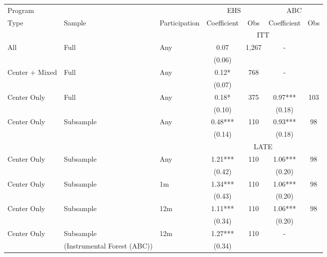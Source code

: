 \begin{tabular}{lllcccc}
\toprule 
\midrule 
\multicolumn{3}{l}{Program} & \multicolumn{2}{c}{EHS} & \multicolumn{2}{c}{ABC} \\
 \cmidrule(lr){1-3} \cmidrule(lr){4-5} \cmidrule(lr){6-7} 
Type & Sample & Participation & Coefficient & Obs & Coefficient & Obs \\
\midrule 
\multicolumn{3}{c}{} & \multicolumn{4}{c}{ITT} \\
 \cmidrule(lr){4-7} 
All & Full & Any & 0.07 & 1,267 & - \\
 &  &  & (0.06) &  \\
Center $+$ Mixed & Full & Any & 0.12* & 768 & - \\
 &  &  & (0.07) &  \\
Center Only & Full & Any & 0.18* & 375 & 0.97*** & 103 \\
 &  &  & (0.10) &  & (0.18) &  \\
Center Only & Subsample & Any & 0.48*** & 110 & 0.93*** & 98 \\
 &  &  & (0.14) &  & (0.18) &  \\
\midrule 
\multicolumn{3}{c}{} & \multicolumn{4}{c}{LATE} \\
 \cmidrule(lr){4-7} 
Center Only & Subsample & Any & 1.21*** & 110 & 1.06*** & 98 \\
 &  &  & (0.42) &  & (0.20) &  \\
Center Only & Subsample & 1m & 1.34*** & 110 & 1.06*** & 98 \\
 &  &  & (0.43) &  & (0.20) &  \\
Center Only & Subsample & 12m & 1.11*** & 110 & 1.06*** & 98 \\
 &  &  & (0.34) &  & (0.20) &  \\
Center Only & Subsample & 12m & 1.27*** & 110 & - \\
 & (Instrumental Forest (ABC)) &  & (0.34) &  \\
\midrule 
\bottomrule 
\end{tabular}
